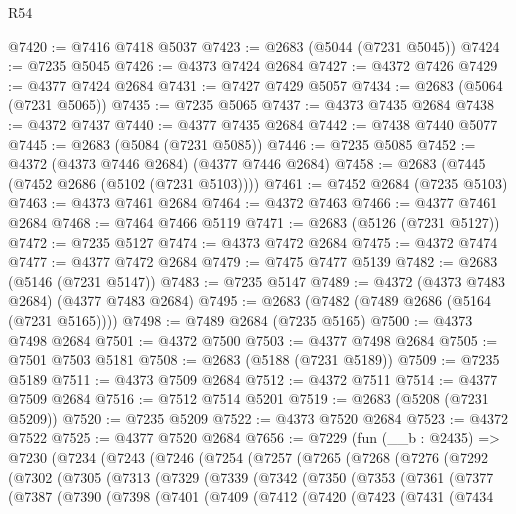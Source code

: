 \begin{lexlean}{R54}
\begin{coremodule}
@7420 := @7416 @7418 @5037
@7423 := @2683 (@5044 (@7231 @5045))
@7424 := @7235 @5045
@7426 := @4373 @7424 @2684
@7427 := @4372 @7426
@7429 := @4377 @7424 @2684
@7431 := @7427 @7429 @5057
@7434 := @2683 (@5064 (@7231 @5065))
@7435 := @7235 @5065
@7437 := @4373 @7435 @2684
@7438 := @4372 @7437
@7440 := @4377 @7435 @2684
@7442 := @7438 @7440 @5077
@7445 := @2683 (@5084 (@7231 @5085))
@7446 := @7235 @5085
@7452 := @4372 (@4373 @7446 @2684) (@4377 @7446 @2684)
@7458 := @2683 (@7445 (@7452 @2686 (@5102 (@7231 @5103))))
@7461 := @7452 @2684 (@7235 @5103)
@7463 := @4373 @7461 @2684
@7464 := @4372 @7463
@7466 := @4377 @7461 @2684
@7468 := @7464 @7466 @5119
@7471 := @2683 (@5126 (@7231 @5127))
@7472 := @7235 @5127
@7474 := @4373 @7472 @2684
@7475 := @4372 @7474
@7477 := @4377 @7472 @2684
@7479 := @7475 @7477 @5139
@7482 := @2683 (@5146 (@7231 @5147))
@7483 := @7235 @5147
@7489 := @4372 (@4373 @7483 @2684) (@4377 @7483 @2684)
@7495 := @2683 (@7482 (@7489 @2686 (@5164 (@7231 @5165))))
@7498 := @7489 @2684 (@7235 @5165)
@7500 := @4373 @7498 @2684
@7501 := @4372 @7500
@7503 := @4377 @7498 @2684
@7505 := @7501 @7503 @5181
@7508 := @2683 (@5188 (@7231 @5189))
@7509 := @7235 @5189
@7511 := @4373 @7509 @2684
@7512 := @4372 @7511
@7514 := @4377 @7509 @2684
@7516 := @7512 @7514 @5201
@7519 := @2683 (@5208 (@7231 @5209))
@7520 := @7235 @5209
@7522 := @4373 @7520 @2684
@7523 := @4372 @7522
@7525 := @4377 @7520 @2684
@7656 := @7229
    (fun (__b : @2435) =>
    @7230
      (@7234
        (@7243
          (@7246
            (@7254
              (@7257
                (@7265
                  (@7268
                    (@7276
                      (@7292
                        (@7302
                          (@7305
                            (@7313
                              (@7329
                                (@7339
                                  (@7342
                                    (@7350
                                      (@7353
                                        (@7361
                                          (@7377
                                            (@7387
                                              (@7390
                                                (@7398
                                                  (@7401
                                                    (@7409
                                                      (@7412
                                                        (@7420
                                                          (@7423
                                                            (@7431
                                                              (@7434

\end{coremodule}
\end{lexlean}
